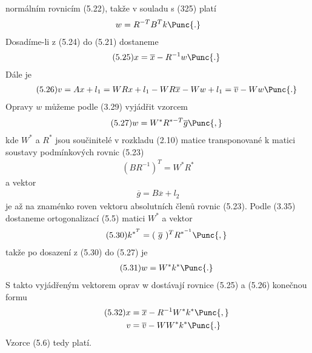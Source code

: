 normálním rovnicím (5.22), takže v souladu s (325) platí
%
\begin{align*}
               w = R^{-T}B^{T}k \Punc{.}
\end{align*}
%
Dosadíme-li z (5.24) do (5.21) dostaneme
\begin{align*}
\tag{5.25}     x = \overline{x} - R^{-1}w \Punc{.}
\end{align*}
%
Dále je
%
\begin{align*}
\tag{5.26}     v = Ax + l_1 = WRx + l_1 - WR\overline{x} - Ww + l_1
                 = \overline{v} - Ww \Punc{.}
\end{align*}
%
Opravy $w$ můžeme podle (3.29) vyjádřit vzorcem
%
\begin{align*}
\tag{5.27}        w = W^*R^{*{-T}}\overline{g} \Punc{,}
\end{align*}
%
kde $W^*$ a $R^*$ jsou součinitelé v rozkladu (2.10) matice
transponované k matici soustavy podmínkových rovnic (5.23)
%
\begin{align*}
\tag{5.28}       (BR^{-1})^T = W^*R^*
\end{align*}
%
a vektor
%
\begin{align*}
\tag{5.29}       \overline{g} = B \overline{x}  + l_2
\end{align*}
%
je až na znaménko roven vektoru absolutních členů rovnic (5.23). Podle
(3.35) dostaneme ortogonalizací (5.5) matici $W^*$ a vektor
%
\begin{align*}
\tag{5.30}       k^{*^T} = (~\overline{g}~)^T R^{*^{-1}} \Punc{,}
\end{align*}
%
takže  po dosazení z (5.30) do (5.27) je
%
\begin{align*}
\tag{5.31}       w = W^*k^* \Punc{.}
\end{align*}
%
S takto vyjádřeným vektorem oprav w dostávají rovnice (5.25)
a (5.26) konečnou formu
%
\begin{align*}
\tag{5.32}       x &= \overline{x} - R^{-1} W^*k^* \Punc{,} \\
                 v &= \overline{v} - WW^*k^*      \Punc{.}
\end{align*}
%
%
Vzorce (5.6) tedy platí.



